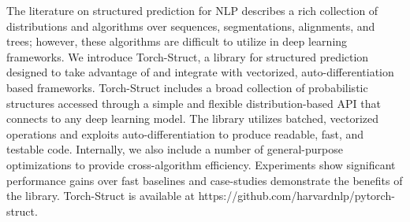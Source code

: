 The literature on structured prediction for NLP describes a rich collection of distributions and algorithms over sequences, segmentations, alignments, and trees; however, these algorithms are difficult to utilize in deep learning frameworks. We introduce Torch-Struct, a library for structured prediction designed to take advantage of and integrate with vectorized, auto-differentiation based frameworks. Torch-Struct includes a broad collection of probabilistic structures accessed through a simple and flexible distribution-based API that connects to any deep learning model. The library utilizes batched, vectorized operations and exploits auto-differentiation to produce readable, fast, and testable code. Internally, we also include a number of general-purpose optimizations to provide cross-algorithm efficiency. Experiments show significant performance gains over fast baselines and case-studies demonstrate the benefits of the library. Torch-Struct is available at https://github.com/harvardnlp/pytorch-struct.
